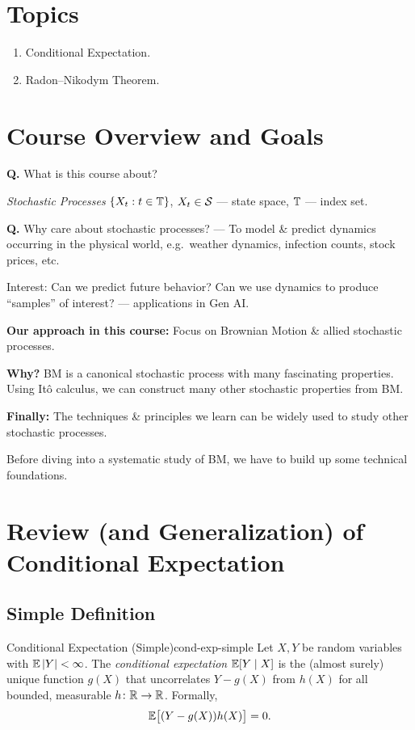 
\section{Topics}
\begin{enumerate}
    \item Conditional Expectation.
    \item Radon--Nikodym Theorem.
\end{enumerate}

\section{Course Overview and Goals}

\textbf{Q.} What is this course about?

\emph{Stochastic Processes} $\{X_t : t \in \mathbb{T}\}$, $X_t \in \mathcal{S}$ --- state space, $\mathbb{T}$ --- index set.

\textbf{Q.} Why care about stochastic processes? --- To model \& predict dynamics occurring in the physical world, e.g.\ weather dynamics, infection counts, stock prices, etc.

Interest: Can we predict future behavior? Can we use dynamics to produce ``samples'' of interest? --- applications in Gen AI.

\textbf{Our approach in this course:} Focus on Brownian Motion \& allied stochastic processes.

\textbf{Why?} BM is a canonical stochastic process with many fascinating properties. Using It\^o calculus, we can construct many other stochastic properties from BM.

\textbf{Finally:} The techniques \& principles we learn can be widely used to study other stochastic processes.

Before diving into a systematic study of BM, we have to build up some technical foundations.

\section{Review (and Generalization) of Conditional Expectation}

\subsection{Simple Definition}

\begin{definition}{Conditional Expectation (Simple)}{cond-exp-simple}
    Let $X, Y$ be random variables with $\mathbb{E}\left|Y\right| < \infty$. The \emph{conditional expectation} $\mathbb{E}[Y \mid X]$ is the (almost surely) unique function $g(X)$ that uncorrelates $Y - g(X)$ from $h(X)$ for all bounded, measurable $h \colon \mathbb{R} \to \mathbb{R}$. Formally,
    \[
        \mathbb{E}\bigl[(Y - g(X)) h(X)\bigr] = 0.
    \]
\end{definition}

